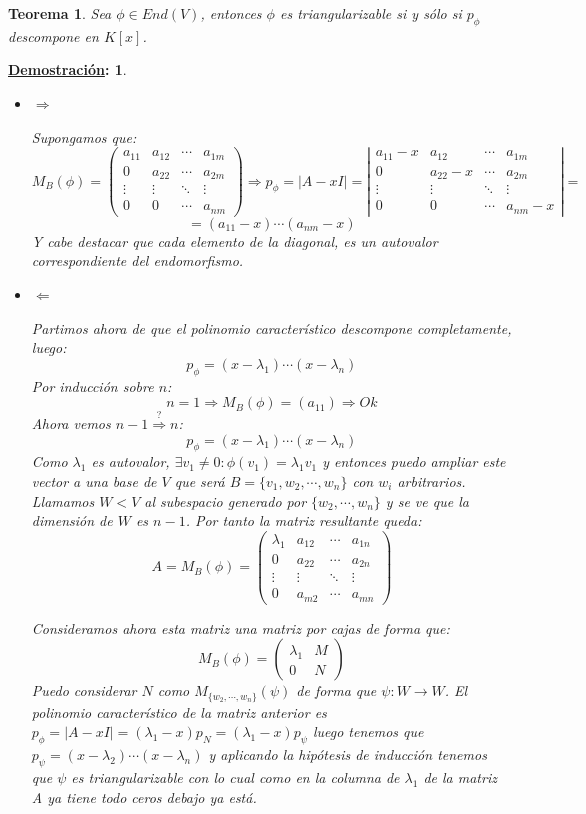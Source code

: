 \documentclass[10pt,a4paper,openright]{book}
\theoremstyle{break}
\newtheorem*{theo}{Teorema}
\newtheorem*{demo}{\underline{Demostración}:}
\begin{document}
\begin{theo}
Sea $\phi\in End(V)$, entonces $\phi$ es triangularizable si y sólo si $p_\phi$ descompone en $K[x]$.
\end{theo}
\begin{demo}
\begin{itemize}
\item $\Rightarrow$

Supongamos que:
$$M_B(\phi)=\begin{pmatrix}
a_{11} & a_{12} & \cdots & a_{1m}\\
0 & a_{22} & \cdots & a_{2m} \\
\vdots & \vdots & \ddots & \vdots \\
0 &0&\cdots &a_{nm}
\end{pmatrix}\Rightarrow p_\phi=|A-xI|=\left|\begin{array}{cccc}
a_{11}-x & a_{12} & \cdots & a_{1m}\\
0 & a_{22}-x & \cdots & a_{2m} \\
\vdots & \vdots & \ddots & \vdots \\
0 &0&\cdots &a_{nm}-x
\end{array} \right|=$$
$$=(a_11-x)\cdots(a_{nm}-x)$$
Y cabe destacar que cada elemento de la diagonal, es un autovalor correspondiente del endomorfismo.

\item $\Leftarrow$

Partimos ahora de que el polinomio característico descompone completamente, luego:
$$p_\phi=(x-\lambda_1)\cdots (x-\lambda_n)$$
Por inducción sobre $n$:
$$n=1\Rightarrow M_B(\phi)=(a_{11})\Rightarrow Ok$$
Ahora vemos $n-1\stackrel{?}{\Rightarrow} n$:
$$p_\phi =(x-\lambda_1)\cdots (x-\lambda_n)$$
Como $\lambda_1$ es autovalor, $\exists v_1\neq 0: \phi(v_1)=\lambda_1v_1$ y entonces puedo ampliar este vector a una base de $V$ que será $B=\{v_1, w_2, \cdots, w_n\}$ con $w_i$ arbitrarios. Llamamos $W<V$ al subespacio generado por $\{w_2, \cdots, w_n\}$ y se ve que la dimensión de $W$ es $n-1$. Por tanto la matriz resultante queda:
$$A=M_B(\phi)=\begin{pmatrix}
\lambda_1 &a_{12} &\cdots & a_{1n} \\
0 & a_{22} & \cdots & a_{2n}\\
\vdots & \vdots & \ddots & \vdots \\
0 & a_{m2} & \cdots & a_{mn}
\end{pmatrix}$$

Consideramos ahora esta matriz una matriz por cajas de forma que:
$$M_B(\phi)=\begin{pmatrix}
\lambda_1 & M\\
0 & N
\end{pmatrix}$$
Puedo considerar $N$ como $M_{\{w_2, \cdots,w_n\}}(\psi)$ de forma que $\psi: W\rightarrow W$. El polinomio característico de la matriz anterior es $p_\phi=|A-xI|=(\lambda_1-x)p_N=(\lambda_1-x)p_\psi$ luego tenemos que $p_\psi = (x-\lambda_2)\cdots (x-\lambda_n)$ y aplicando la hipótesis de inducción tenemos que $\psi$ es triangularizable con lo cual como en la columna de $\lambda_1$ de la matriz A ya tiene todo ceros debajo ya está.
\end{itemize}
\end{demo}
\end{document}
